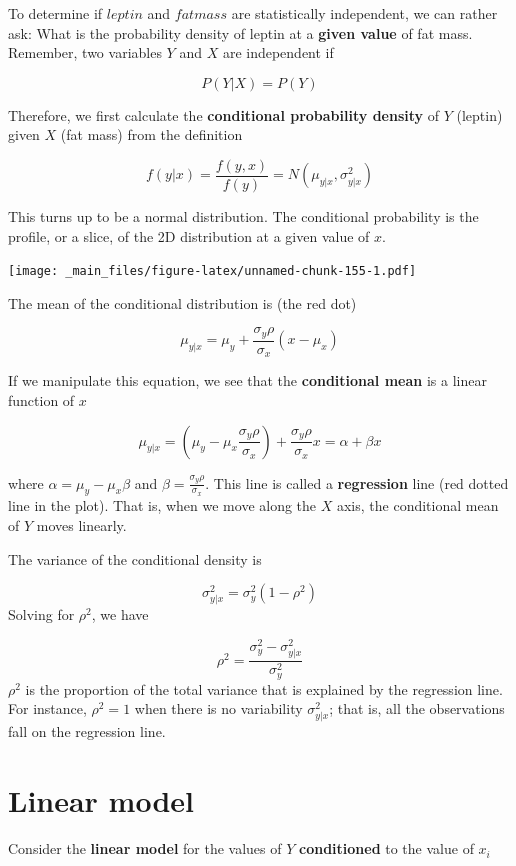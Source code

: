 \documentclass[
]{book}
\begin{document}
To determine if \(leptin\) and \(fatmass\) are statistically independent, we can rather ask: What is the probability density of leptin at a \textbf{given value} of fat mass. Remember, two variables \(Y\) and \(X\) are independent if

\[P(Y|X)=P(Y)\]

Therefore, we first calculate the \textbf{conditional probability density} of \(Y\) (leptin) given \(X\) (fat mass) from the definition

\[f(y|x)=\frac{f(y,x)}{f(y)}
=N(\mu_{y|x}, \sigma^2_{y|x})\]

This turns up to be a normal distribution. The conditional probability is the profile, or a slice, of the 2D distribution at a given value of \(x\).

\texttt{[image: \_main\_files/figure-latex/unnamed-chunk-155-1.pdf]}

The mean of the conditional distribution is (the red dot)

\[\mu_{y|x}=\mu_y+\frac{\sigma_y\rho}{\sigma_x}(x-\mu_x)\]

If we manipulate this equation, we see that the \textbf{conditional mean} is a linear function of \(x\)

\[\mu_{y|x}=(\mu_y-\mu_x \frac{\sigma_y\rho}{\sigma_x})+\frac{\sigma_y \rho}{\sigma_x} x=\alpha + \beta x\]

where \(\alpha=\mu_y-\mu_x \beta\) and \(\beta=\frac{\sigma_y \rho}{\sigma_x}\). This line is called a \textbf{regression} line (red dotted line in the plot). That is, when we move along the \(X\) axis, the conditional mean of \(Y\) moves linearly.

The variance of the conditional density is

\[\sigma^2_{y|x}= \sigma_y^2(1-\rho^2)\]
Solving for \(\rho^2\), we have

\[\rho^2=\frac{\sigma_y^2-\sigma^2_{y|x}}{\sigma_y^2} \]
\(\rho^2\) is the proportion of the total variance that is explained by the regression line. For instance, \(\rho^2=1\) when there is no variability \(\sigma^2_{y|x}\); that is, all the observations fall on the regression line.

\hypertarget{linear-model-3}{%
\section{Linear model}\label{linear-model-3}}

Consider the \textbf{linear model} for the values of \(Y\) \textbf{conditioned} to the value of \(x_i\)
\end{document}
